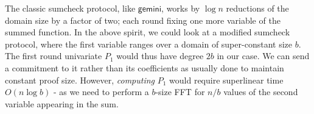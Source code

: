 \documentclass[11pt]{article} %
\newcommand{\gemini}{\ensuremath{\mathsf{gemini}}\xspace}
\newcommand{\eq}{\ensuremath{\mathsf{eq}}\xspace}
\renewcommand{\eq}{\ensuremath{\mathbf{eq}}\xspace}
\newcommand{\mle}[1]{\ensuremath{\mathsf{ml}(#1)}\xspace}
\begin{document}
The classic sumcheck protocol, like \gemini, works by $\log n$ reductions of the domain size by a factor of two; each round fixing one more variable of the summed function. In the above spirit, we could look at a modified sumcheck protocol, where the first variable ranges over a domain of super-constant size $b$. The first round univariate $P_1$ would thus have degree $2b$ in our case. We can send a  commitment to it rather than its coefficients as usually done to maintain constant proof size.
However, \emph{computing} $P_1$ would require superlinear time  $O(n \log b)$ - as we need to perform a $b$-size FFT for $n/b$ values of the second variable appearing in the sum. 


% 
% 
% 
% 
% 
% 
% 
% 
% 
% 
% 
% 
% 
\end{document}
